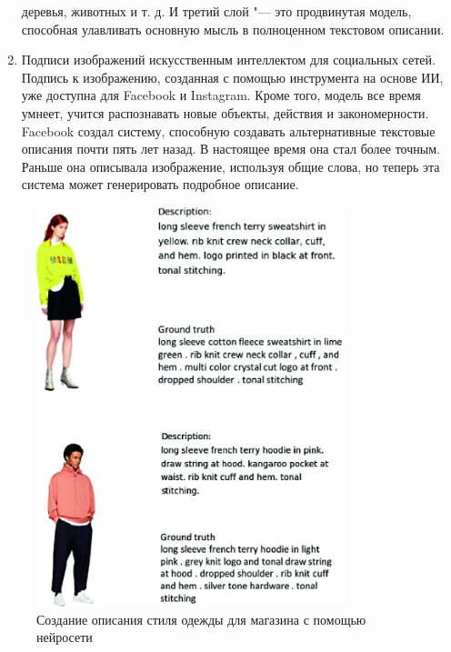 \documentclass[bachelor, och, coursework]{SCWorks}
\begin{document}
\begin{enumerate}
                деревья, животных и т. д. И третий слой "--- это продвинутая
                модель, способная улавливать основную мысль в полноценном
                текстовом описании.
            \item
                Подписи изображений искусственным интеллектом для социальных
                сетей. Подпись к изображению, созданная с помощью инструмента на
                основе ИИ, уже доступна для Facebook и Instagram. Кроме того,
                модель все время умнеет, учится распознавать новые объекты,
                действия и закономерности. Facebook создал систему, способную
                создавать альтернативные текстовые описания почти пять лет
                назад. В настоящее время она стал более точным. Раньше она
                описывала изображение, используя общие слова, но теперь эта
                система может генерировать подробное описание.
        \end{enumerate}

        \begin{figure}[H]
            \centering
            \includegraphics[width=0.8\textwidth]{pics/example.png}
            \caption{Создание описания стиля одежды для магазина с помощью
            нейросети \cite{apppic}}
        \end{figure}
\end{document}
